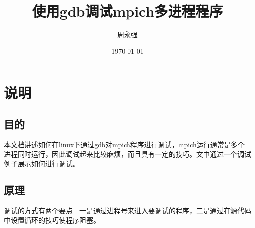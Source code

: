 \documentclass[a4paper]{article}
\title{使用gdb调试mpich多进程程序} %
\author{周永强} %
\date{\today} %
\begin{document}
\maketitle %

\section{说明} %

\subsection{目的} %
本文档讲述如何在linux下通过gdb对mpich程序进行调试，mpich运行通常是多个进程同时运行，因此调试起来比较麻烦，而且具有一定的技巧。文中通过一个调试例子展示如何进行调试。

\subsection{原理} %
调试的方式有两个要点：一是通过进程号来进入要调试的程序，二是通过在源代码中设置循环的技巧使程序阻塞。
\end{document}
